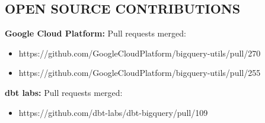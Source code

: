 \documentclass[margin]{res}
\begin{document}
\begin{resume}

\section{OPEN SOURCE CONTRIBUTIONS}

\textbf{Google Cloud Platform:} 
Pull requests merged:
\begin{itemize}
  \item https://github.com/GoogleCloudPlatform/bigquery-utils/pull/270
  \item https://github.com/GoogleCloudPlatform/bigquery-utils/pull/255
\end{itemize}

\textbf{dbt labs:}
Pull requests merged:
\begin{itemize}
  \item https://github.com/dbt-labs/dbt-bigquery/pull/109
\end{itemize}



\end{resume}
\(\)
\end{document}
